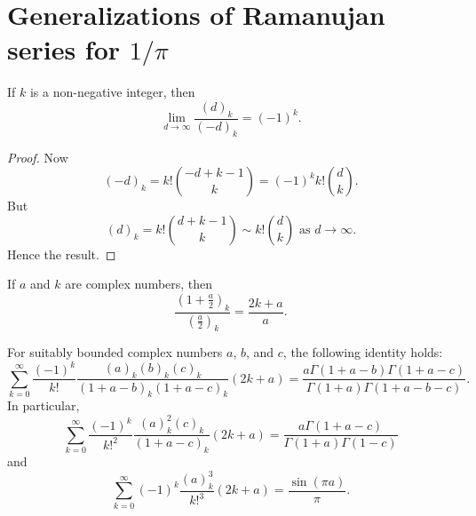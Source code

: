 \documentclass[12pt,reqno]{article}
\begin{document}
\section{Generalizations of Ramanujan series for $1/\pi$}
\begin{lemma}\label{rutep3z}
If $k$ is a non-negative integer, then
\begin{equation}
\lim_{d\to\infty}{\frac{{\left( d \right)_k }}{{\left( { - d} \right)_k }}} = ( - 1)^k .
\end{equation}
\end{lemma}
\begin{proof}
Now
\begin{equation}
\left( { - d} \right)_k  = k!\binom{{ - d + k - 1}}{k} = ( - 1)^k k!\binom{{d}}{k}.
\end{equation}
But
\begin{equation}
\left( d \right)_k  = k!\binom{{d + k - 1}}{k} \sim k!\binom{{d}}{k}\text{ as $d\to\infty$}.
\end{equation}
Hence the result.
\end{proof}
\begin{lemma}\label{z2u9bwg}
If $a$ and $k$ are complex numbers, then
\begin{equation}
\frac{{\left( {1 + \frac{a}{2}} \right)_k }}{{\left( {\frac{a}{2}} \right)_k }} = \frac{{2k + a}}{a}.
\end{equation}
\end{lemma}
\begin{lemma}
For suitably bounded complex numbers $a$, $b$, and $c$, the following identity holds:
\begin{equation}\label{rbz4noe}
\sum_{k = 0}^\infty  {\frac{{( - 1)^k }}{{k!}}\frac{{\left( a \right)_k \left( b \right)_k \left( c \right)_k }}{{\left( {1 + a - b} \right)_k \left( {1 + a - c} \right)_k }}\left( {2k + a} \right)}  = \frac{{a\Gamma \left( {1 + a - b} \right)\Gamma \left( {1 + a - c} \right)}}{{\Gamma \left( {1 + a} \right)\Gamma \left( {1 + a - b - c} \right)}}.
\end{equation}
In particular,
\begin{equation}\label{q0xvexn}
\sum_{k = 0}^\infty  {\frac{{( - 1)^k }}{{k!^2 }}\frac{{\left( a \right)_k^2 \left( c \right)_k }}{{\left( {1 + a - c} \right)_k }}\left( {2k + a} \right)}  = \frac{{a\Gamma \left( {1 + a - c} \right)}}{{\Gamma \left( {1 + a} \right)\Gamma \left( {1 - c} \right)}}
\end{equation}
and
\begin{equation}\label{nw1xvnr}
\sum_{k = 0}^\infty  {( - 1)^k \frac{{\left( a \right)_k^3 }}{{k!^3 }}\left( {2k + a} \right)}  = \frac{{\sin \left( {\pi a} \right)}}{\pi }.
\end{equation}
\end{lemma}
\end{document}
